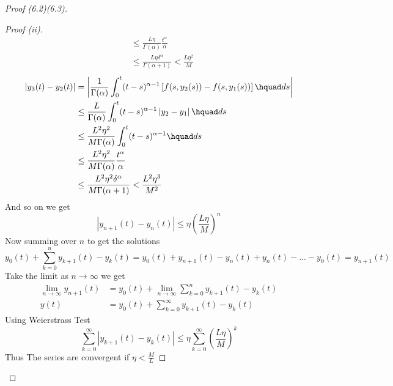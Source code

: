 \begin{proof}[Proof (6.2)(6.3)]
\begin{proof}[Proof (ii)]
\begin{align*}
            &\leq \frac{L\eta}{\Gamma(\alpha)} \frac{t^\alpha}{\alpha}
            \\
            &\leq \frac{L\eta\delta^\alpha}{\Gamma(\alpha+1)} <  \frac{L\eta^2}{M}
        \end{align*}
        \begin{align*}
            |y_3(t)-y_2(t)| &= \left| \frac{1}{\Gamma(\alpha)} \int_{0}^{t} (t-s)^{\alpha-1}\left[f(s,y_{2}(s))-f(s,y_{1}(s))\right] \hquad ds \right|
            \\
            &\leq \frac{L}{\Gamma(\alpha)} \int_{0}^{t} (t-s)^{\alpha-1} \left|y_2-y_1\right| \hquad ds 
            \\
            &\leq \frac{L^2\eta^2}{M\Gamma(\alpha)} \int_{0}^{t} (t-s)^{\alpha-1} \hquad ds 
            \\
            &\leq \frac{L^2\eta^2}{M\Gamma(\alpha)} \frac{t^\alpha}{\alpha}
            \\
            &\leq \frac{L^2\eta^2\delta^\alpha}{M\Gamma(\alpha+1)} < \frac{L^2\eta^3}{M^2}
        \end{align*}
        And so on we get 
        \[
            |y_{n+1}(t)-y_{n}(t)| \leq \eta \left(\frac{L\eta}{M}\right)^{n}
        \]
        Now summing over $n$ to get the solutions
        \[
            y_{0}(t) + \sum_{k=0}^{n} y_{k+1}(t)-y_{k}(t) = y_{0}(t) + y_{n+1}(t)-y_{n}(t)+y_{n}(t)-\dots-y_{0}(t) = y_{n+1}(t)
        \]
        Take the limit as $n \to \infty$ we get 
        \begin{align*}
            \lim_{n \to \infty} y_{n+1}(t) &= y_{0}(t) + \lim_{n \to \infty} \sum_{k=0}^{n} y_{k+1}(t)-y_{k}(t)
            \\
            y(t) &= y_{0}(t) + \sum_{k=0}^{\infty} y_{k+1}(t)-y_{k}(t)
        \end{align*}
        Using Weierstrass Test 
        \[
            \sum_{k=0}^{\infty} |y_{k+1}(t)-y_{k}(t)| \leq \eta \sum_{k=0}^{\infty} \left(\frac{L\eta}{M}\right)^{k}
        \]
        Thus The series are convergent if $\displaystyle \eta < \frac{M}{L}$


\end{proof}
\end{proof}
